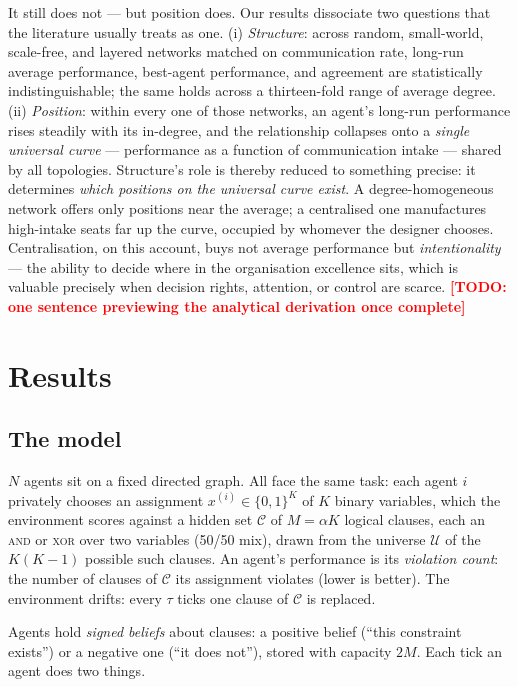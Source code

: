 \documentclass{article}
\newcommand{\todo}[1]{\textcolor{red}{\textbf{[TODO: #1]}}}
\begin{document}
It still does not --- but position does. Our results dissociate two questions that the literature usually treats as one. (i) \emph{Structure}: across random, small-world, scale-free, and layered networks matched on communication rate, long-run average performance, best-agent performance, and agreement are statistically indistinguishable; the same holds across a thirteen-fold range of average degree. (ii) \emph{Position}: within every one of those networks, an agent's long-run performance rises steadily with its in-degree, and the relationship collapses onto a \emph{single universal curve} --- performance as a function of communication intake --- shared by all topologies. Structure's role is thereby reduced to something precise: it determines \emph{which positions on the universal curve exist}. A degree-homogeneous network offers only positions near the average; a centralised one manufactures high-intake seats far up the curve, occupied by whomever the designer chooses. Centralisation, on this account, buys not average performance but \emph{intentionality} --- the ability to decide where in the organisation excellence sits, which is valuable precisely when decision rights, attention, or control are scarce. \todo{one sentence previewing the analytical derivation once complete}

\section{Results}\label{sec:results}

\subsection{The model}\label{sec:model}

$N$ agents sit on a fixed directed graph. All face the same task: each agent $i$ privately chooses an assignment $x^{(i)} \in \{0,1\}^K$ of $K$ binary variables, which the environment scores against a hidden set $\mathcal{C}$ of $M = \alpha K$ logical clauses, each an \textsc{and} or \textsc{xor} over two variables (50/50 mix), drawn from the universe $\mathcal{U}$ of the $K(K-1)$ possible such clauses. An agent's performance is its \emph{violation count}: the number of clauses of $\mathcal{C}$ its assignment violates (lower is better). The environment drifts: every $\tau$ ticks one clause of $\mathcal{C}$ is replaced.

Agents hold \emph{signed beliefs} about clauses: a positive belief (``this constraint exists'') or a negative one (``it does not''), stored with capacity $2M$. Each tick an agent does two things.
\end{document}
